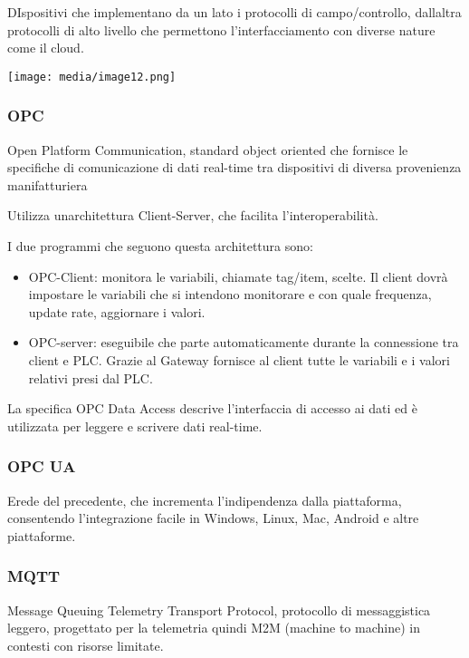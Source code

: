 DIspositivi che implementano da un lato i protocolli di campo/controllo,
dall\textquotesingle altra protocolli di alto livello che permettono
l'interfacciamento con diverse nature come il cloud.

\texttt{[image: media/image12.png]}

\subsubsection{OPC}\label{opc}

Open Platform Communication, standard object oriented che fornisce le
specifiche di comunicazione di dati real-time tra dispositivi di diversa
provenienza manifatturiera

Utilizza un\textquotesingle architettura Client-Server, che facilita
l'interoperabilità.

I due programmi che seguono questa architettura sono:

\begin{itemize}
\item
  OPC-Client: monitora le variabili, chiamate tag/item, scelte. Il
  client dovrà impostare le variabili che si intendono monitorare e con
  quale frequenza, update rate, aggiornare i valori.
\item
  OPC-server: eseguibile che parte automaticamente durante la
  connessione tra client e PLC. Grazie al Gateway fornisce al client
  tutte le variabili e i valori relativi presi dal PLC.
\end{itemize}

La specifica OPC Data Access descrive l'interfaccia di accesso ai dati
ed è utilizzata per leggere e scrivere dati real-time.

\subsubsection{OPC UA}\label{opc-ua}

Erede del precedente, che incrementa l'indipendenza dalla piattaforma,
consentendo l'integrazione facile in Windows, Linux, Mac, Android e
altre piattaforme.

\subsubsection{MQTT}\label{mqtt}

Message Queuing Telemetry Transport Protocol, protocollo di
messaggistica leggero, progettato per la telemetria quindi M2M (machine
to machine) in contesti con risorse limitate.


